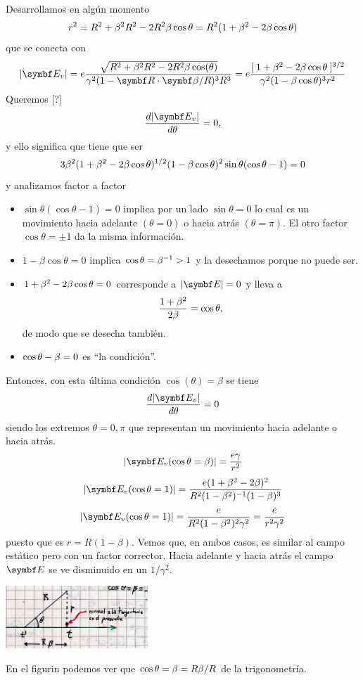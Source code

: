 \documentclass[10pt,oneside]{CBFT_book}
\begin{document}
Desarrollamos en algún momento
\[
	r^2 = R^2 + \beta^2R^2 - 2R^2\beta\cos\theta = R^2(1+\beta^2-2\beta\cos\theta)
\]
que se conecta con
\[
	|\vb{E}_v| = e\frac{\sqrt{ R^2 + \beta^2 R^2 - 2R^2 \beta \cos(\theta)}}
		{\gamma^2( 1 - \vb{R}\cdot\vb{\beta}/R)^3 R^3} =
		e\frac{ [ \: 1 + \beta^2 - 2 \beta \cos\theta \: ]^{3/2}}
		{\gamma^2( 1 - \beta \cos\theta )^3 r^2}
\]
Queremos [?]
\[
	\dtot{ |\vb{E}_v| }{\theta}= 0,
\]
y ello significa que tiene que ser
\[
	3\beta^2 ( 1 + \beta^2 - 2\beta \cos\theta )^{1/2} ( 1 - \beta \cos\theta )^2 
	\sin\theta (\cos\theta -1) = 0
\]
y analizamos factor a factor
\begin{itemize}
 \item $\sin\theta (\cos\theta -1) = 0$ implica por un lado $\sin\theta=0$ lo cual
 es un movimiento hacia adelante $(\theta=0)$ o hacia atrás $(\theta=\pi)$. El
 otro factor $\cos\theta = \pm 1$ da la misma información.
 \item $1 - \beta \cos\theta = 0$ implica $ \cos\theta = \beta^{-1} > 1 $ y la 
 desechamos porque no puede ser.
 \item $1 + \beta^2 - 2\beta \cos\theta = 0$ corresponde a $|\vb E|=0$ y lleva a
	\[
		\frac{1 + \beta^2}{2\beta} = \cos\theta, 
	\]
	de modo que se desecha también.
 \item $\cos\theta - \beta = 0$ es ``la condición''.
\end{itemize}

Entonces, con esta última condición $\cos(\theta) = \beta$ se tiene
\[
	\dtot{ |\vb{E}_v| }{\theta}= 0
\]
siendo los extremos $\theta=0,\pi$ que representan un movimiento hacia adelante o hacia atrás.
\[
	|\vb{E}_v(\cos\theta = \beta)| = \frac{e\gamma}{r^2}
\]
\[
	|\vb{E}_v(\cos\theta = 1)| = \frac{e (1+\beta^2-2\beta)^2}{R^2(1-\beta^2)^{-1}(1-\beta)^3}
\]
\[
	|\vb{E}_v{(\cos\theta = 1)}| = \frac{e }{R^2(1-\beta^2)^2 \gamma^2} = \frac{e}{r^2 \gamma^2}
\]
puesto que es $r=R(1-\beta)$. Vemos que, en ambos casos, es similar al campo estático pero con 
un factor corrector. Hacia adelante y hacia atrás el campo $\vb E$ se ve disminuido en un $1/\gamma^2$.

\includegraphics[width=0.4\textwidth]{images/fig_ft1_campo_carga_movJPG1.jpg}

En el figurin podemos ver que $\cos\theta=\beta=R\beta/R$ de la trigonometría.
\end{document}
